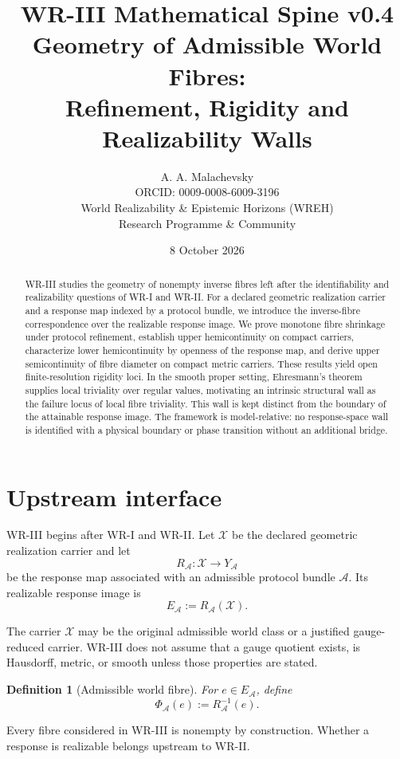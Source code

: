\documentclass[11pt]{article}
\title{\textbf{WR-III Mathematical Spine v0.4}\\[4pt]
\large Geometry of Admissible World Fibres:\\
Refinement, Rigidity and Realizability Walls}
\author{A. A. Malachevsky\\
ORCID: 0009-0008-6009-3196\\
World Realizability \& Epistemic Horizons (WREH)\\
Research Programme \& Community}
\date{8 October 2026}
\newtheorem{definition}{Definition}[section]
\newcommand{\X}{\mathcal X}
\newcommand{\Acal}{\mathcal A}
\begin{document}
\maketitle

\begin{abstract}
WR-III studies the geometry of nonempty inverse fibres left after the
identifiability and realizability questions of WR-I and WR-II. For a declared
geometric realization carrier and a response map indexed by a protocol bundle,
we introduce the inverse-fibre correspondence over the realizable response
image. We prove monotone fibre shrinkage under protocol refinement, establish
upper hemicontinuity on compact carriers, characterize lower hemicontinuity by
openness of the response map, and derive upper semicontinuity of fibre diameter
on compact metric carriers. These results yield open finite-resolution
rigidity loci. In the smooth proper setting, Ehresmann's theorem supplies local
triviality over regular values, motivating an intrinsic structural wall as the
failure locus of local fibre triviality. This wall is kept distinct from the
boundary of the attainable response image. The framework is model-relative:
no response-space wall is identified with a physical boundary or phase
transition without an additional bridge.
\end{abstract}

\section{Upstream interface}

WR-III begins after WR-I and WR-II. Let \(\X\) be the declared geometric
realization carrier and let
\[
R_{\Acal}:\X\to Y_{\Acal}
\]
be the response map associated with an admissible protocol bundle \(\Acal\).
Its realizable response image is
\[
E_{\Acal}:=R_{\Acal}(\X).
\]

The carrier \(\X\) may be the original admissible world class or a justified
gauge-reduced carrier. WR-III does not assume that a gauge quotient exists, is
Hausdorff, metric, or smooth unless those properties are stated.

\begin{definition}[Admissible world fibre]
For \(e\in E_{\Acal}\), define
\[
\Phi_{\Acal}(e):=R_{\Acal}^{-1}(e).
\]
\end{definition}

Every fibre considered in WR-III is nonempty by construction. Whether a
response is realizable belongs upstream to WR-II.
\end{document}
